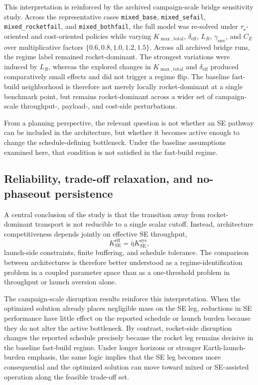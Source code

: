 \documentclass[12pt]{article}
\begin{document}
This interpretation is reinforced by the archived campaign-scale bridge sensitivity study. Across the representative cases \texttt{mixed\_base}, \texttt{mixed\_sefail}, \texttt{mixed\_rocketfail}, and \texttt{mixed\_bothfail}, the full model was re-solved under \(\tau_\star\)-oriented and cost-oriented policies while varying \(K_{\max,\mathrm{total}}\), \(\delta_{\mathrm{eff}}\), \(L_R\), \(\gamma_{\mathrm{env}}\), and \(C_E\) over multiplicative factors \(\{0.6,0.8,1.0,1.2,1.5\}\). Across all archived bridge runs, the regime label remained rocket-dominant. The strongest variations were induced by \(L_R\), whereas the explored changes in \(K_{\max,\mathrm{total}}\) and \(\delta_{\mathrm{eff}}\) produced comparatively small effects and did not trigger a regime flip. The baseline fast-build neighborhood is therefore not merely locally rocket-dominant at a single benchmark point, but remains rocket-dominant across a wider set of campaign-scale throughput-, payload-, and cost-side perturbations.

From a planning perspective, the relevant question is not whether an SE pathway can be included in the architecture, but whether it becomes active enough to change the schedule-defining bottleneck. Under the baseline assumptions examined here, that condition is not satisfied in the fast-build regime.

\subsection{Reliability, trade-off relaxation, and no-phaseout persistence}
\label{subsec:discussion_regime}

A central conclusion of the study is that the transition away from rocket-dominant transport is not reducible to a single scalar cutoff. Instead, architecture competitiveness depends jointly on effective SE throughput,
\[
K_{\mathrm{SE}}^{\mathrm{eff}}=\bar{\eta}K_{\mathrm{SE}}^{\mathrm{sys}},
\]
launch-side constraints, finite buffering, and schedule tolerance. The comparison between architectures is therefore better understood as a regime-identification problem in a coupled parameter space than as a one-threshold problem in throughput or launch aversion alone.

The campaign-scale disruption results reinforce this interpretation. When the optimized solution already places negligible mass on the SE leg, reductions in SE performance have little effect on the reported schedule or launch burden because they do not alter the active bottleneck. By contrast, rocket-side disruption changes the reported schedule precisely because the rocket leg remains decisive in the baseline fast-build regime. Under longer horizons or stronger Earth-launch-burden emphasis, the same logic implies that the SE leg becomes more consequential and the optimized solution can move toward mixed or SE-assisted operation along the feasible trade-off set.
\end{document}
